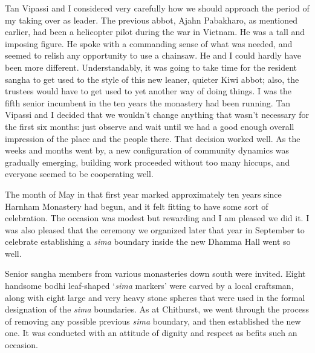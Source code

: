 
\enlargethispage{2\baselineskip}

Tan Vipassi and I considered very carefully how we should approach the
period of my taking over as leader. The previous abbot, Ajahn Pabakharo,
as mentioned earlier, had been a helicopter pilot during the war in
Vietnam. He was a tall and imposing figure. He spoke with a commanding
sense of what was needed, and seemed to relish any opportunity to use a
chainsaw. He and I could hardly have been more different.
Understandably, it was going to take time for the resident sangha to get
used to the style of this new leaner, quieter Kiwi abbot; also, the
trustees would have to get used to yet another way of doing things. I
was the fifth senior incumbent in the ten years the monastery had been
running. Tan Vipassi and I decided that we wouldn't change anything that
wasn't necessary for the first six months: just observe and wait until
we had a good enough overall impression of the place and the people there.
That decision worked well. As the weeks and months went by, a new
configuration of community dynamics was gradually emerging, building work
proceeded without too many hiccups, and everyone seemed to be
cooperating well.

The month of May in that first year marked approximately ten years since
Harnham Monastery had begun, and it felt fitting to have some sort of
celebration. The occasion was modest but rewarding and I am pleased we
did it. I was also pleased that the ceremony we organized later that
year in September to celebrate establishing a \emph{sima} boundary
inside the new Dhamma Hall went so well.

Senior sangha members from various monasteries down south were invited.
Eight handsome bodhi leaf-shaped `\emph{sima} markers' were carved by a
local craftsman, along with eight large and very heavy stone spheres
that were used in the formal designation of the \emph{sima} boundaries.
As at Chithurst, we went through the process of removing any possible
previous \emph{sima} boundary, and then established the new one. It was
conducted with an attitude of dignity and respect as befits such an
occasion.

\enlargethispage{\baselineskip}

